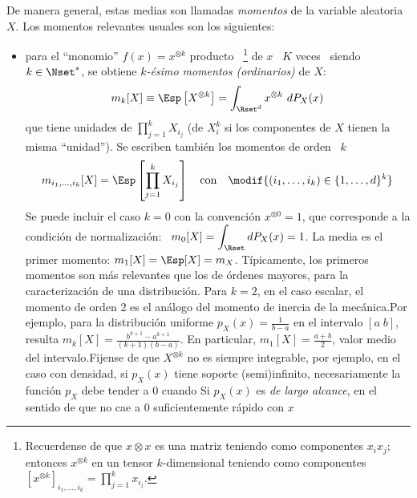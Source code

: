 De  manera general,  estas medias  son llamadas  {\it momentos}  de  la variable
aleatoria $X$. Los momentos relevantes usuales son los siguientes:
%
\begin{itemize}
\item    para    el    ``monomio''    $f(x)   =    x^{\otimes    k}$    producto
  ~\footnote{Recuerdense  de  que $x  \otimes  x$  es una  matriz
    teniendo como componentes  $x_i x_j$; entonces $x^{\otimes k}$  en un tensor
    $k$-dimensional teniendo como  componentes $ \displaystyle \left[ x^{\otimes
        k}  \right]_{i_1,\ldots,i_k} =  \prod_{j=1}^k x_{i_j}$.}
   de $x$  \ $K$
  veces \ siendo \ $k \in \Nset^*$, se obtiene  $k${\it-\'esimo momentos (ordinarios)} de $X$:
  \[
  m_k[X] \equiv \Esp\left[  X^{\otimes k} \right] = \int_{\Rset^d}  x^{\otimes k} \
  dP_X(x)
  \]
  que tiene unidades de $\prod_{j=1}^k X_{i_j}$  (de $X_i^k$ si los componentes de $X$
  tienen la  misma ``unidad'').  Se escriben  tambi\'en los momentos  de orden \
  $k$ \ 
  \[
  m_{i_1,\ldots,i_k}[X]  =  \Esp\left[   \prod_{j=1}^k  X_{i_j}  \right]  \quad
  \mbox{con} \quad \modif{(i_1 , \ldots , i_k) \in \{ 1 , \ldots , d \}^k }
  \]
    Se puede  incluir el caso $k=0$
  con la convenci\'on  $x^{\otimes 0} = 1$, que corresponde  a la condici\'on de
  normalizaci\'on: \ $\displaystyle m_0[X] =  \int_\Rset dP_X(x) = 1$.  La media
  es el primer  momento: $m_1[X] = \Esp[X] =  m_X$.  T\'ipicamente, los primeros
  momentos  son  m\'as  relevantes  que   los  de  \'ordenes  mayores,  para  la
  caracterizaci\'on de una distribuci\'on.  Para $k = 2$, en el caso escalar, el
  momento  de   orden  2  es  el   an\'alogo  del  momento  de   inercia  de  la
  mec\'anica.\newline  Por ejemplo,  para la  distribuci\'on uniforme  $p_X(x) =
  \frac{1}{b-a}$   en  el   intervalo   $[   a  \;   b]$,   resulta  $m_k[X]   =
  \frac{b^{k+1}-a^{k+1}}{(k+1)(b-a)}$.  En particular, $m_1[X] = \frac{a+b}{2}$,
  valor  medio del  intervalo.\newline  Fijense  de que  $X^{\otimes  k}$ no  es
  siempre integrable,  por ejemplo, en el  caso con densidad,  si $p_X(x)$ tiene
  soporte (semi)infinito,  necesariamente la funci\'on  $p_X$ debe tender  a $0$
  cuando \modif{$\|  x \|  \rightarrow \infty$.}  Si  $p_X(x)$ es {\it  de largo
    alcance}, en el sentido de que no cae a $0$ suficientemente r\'apido con $x$

\end{itemize}
